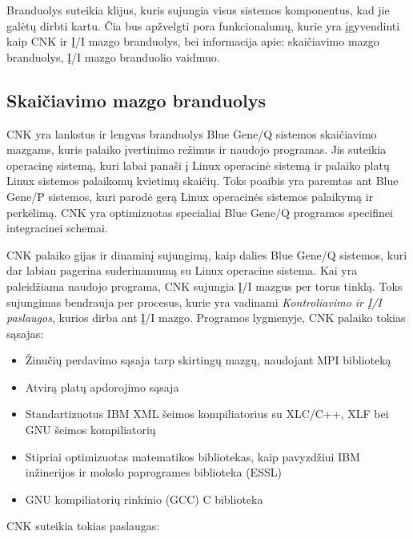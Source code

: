 Branduolys suteikia klijus, kuris sujungia visus sistemos komponentus, kad jie galėtų dirbti kartu.
Čia bus apžvelgti pora funkcionalumų, kurie yra įgyvendinti kaip CNK ir Į/I mazgo branduolys, bei informacija apie: skaičiavimo mazgo branduolys, Į/I mazgo branduolio vaidmuo.

\subsection{Skaičiavimo mazgo branduolys}

CNK yra lankstus ir lengvas branduolys Blue Gene/Q sistemos skaičiavimo mazgams, kuris palaiko įvertinimo režimus ir naudojo programas.
Jis suteikia operacinę sistemą, kuri labai panaši į Linux operacinė sistemą ir palaiko platų Linux sistemos palaikomų kvietimų skaičių.
Toks poaibis yra paremtas ant Blue Gene/P sistemos, kuri parodė gerą Linux operacinės sistemos palaikymą ir perkėlimą.
CNK yra optimizuotas specialiai Blue Gene/Q programos specifinei integracinei schemai.

CNK palaiko gijas ir dinaminį sujungimą, kaip dalies Blue Gene/Q sistemos, kuri dar labiau pagerina suderinamumą su Linux operacine sistema.
Kai yra paleidžiama naudojo programa, CNK sujungia Į/I mazgus per torus tinklą.
Toks sujungimas bendrauja per procesus, kurie yra vadinami \textit{Kontroliavimo ir Į/I paslaugos}, kurios dirba ant Į/I mazgo.
Programos lygmenyje, CNK palaiko tokias sąsajas:

\begin{itemize}
    \item Žinučių perdavimo sąsaja tarp skirtingų mazgų, naudojant MPI biblioteką
    \item Atvirą platų apdorojimo sąsaja
    \item Standartizuotus IBM XML šeimos kompiliatorius su XLC/C++, XLF bei GNU šeimos kompiliatorių
    \item Stipriai optimizuotas matematikos bibliotekas, kaip pavyzdžiui IBM inžinerijos ir mokslo paprogrames biblioteka (ESSL)
    \item GNU kompiliatorių rinkinio (GCC) C biblioteka
\end{itemize}

CNK suteikia tokias paslaugas:


